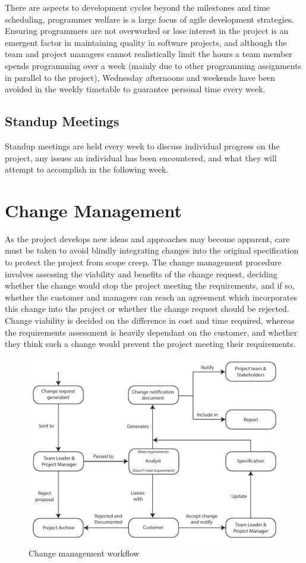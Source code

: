 There are aspects to development cycles beyond the milestones and time scheduling, programmer welfare is a large focus of agile development strategies. Ensuring programmers are not overworked or lose interest in the project is an emergent factor in maintaining quality in software projects, and although the team and project managers cannot realistically limit the hours a team member spends programming over a week (mainly due to other programming assignments in parallel to the project), Wednesday afternoons and weekends have been avoided in the weekly timetable to guarantee personal time every week.

\subsection{Standup Meetings}
Standup meetings are held every week to discuss individual progress on the project, any issues an individual has been encountered, and what they will attempt to accomplish in the following week.

\section{Change Management}
As the project develops new ideas and approaches may become apparent, care must be taken to avoid blindly integrating changes into the original specification to protect the project from scope creep. The change management procedure involves assessing the viability and benefits of the change request, deciding whether the change would stop the project meeting the requirements, and if so, whether the customer and managers can reach an agreement which incorporates this change into the project or whether the change request should be rejected. Change viability is decided on the difference in cost and time required, whereas the requirements assessment is heavily dependant on the customer, and whether they think such a change would prevent the project meeting their requirements.

\begin{figure}[h!]
	\includegraphics{res/change_management_diagram}
	\caption{Change management workflow}
\end{figure}

